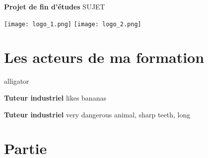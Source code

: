 \documentclass[a4paper,french,11pt]{report}
\begin{document}

\begin{titlepage}

\thispagestyle{plain}

\begin{center}
\Huge{\textbf{Projet de fin d'études}}
\vspace{0.5cm}
\LARGE{SUJET}
           
           
\texttt{[image: logo\_1.png]}
\texttt{[image: logo\_2.png]}
           
\end{center}

\end{titlepage}


\tableofcontents

\listoffigures


\chapter{Les acteurs de ma formation}

\begin{labeling}{alligator}

\item [\textbf{Tuteur industriel}] likes bananas
\item [\textbf{Tuteur industriel}] very dangerous animal, sharp teeth, long

\end{labeling}


\chapter{Partie}
\end{document}
